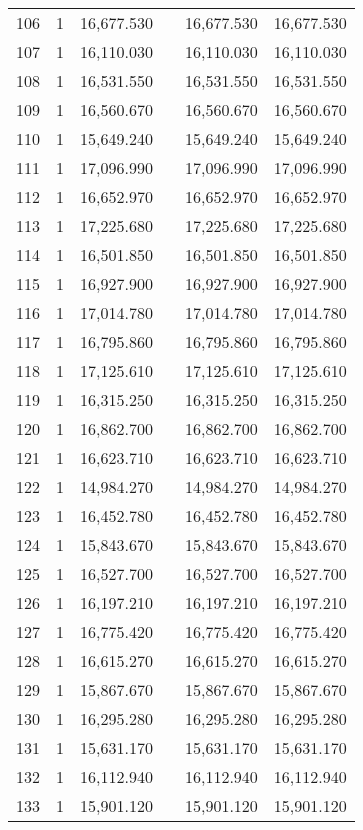 \begin{table}[!htbp]
\begin{tabular}{@{\extracolsep{5pt}}lccccc}
106 & 1 & 16,677.530 &  & 16,677.530 & 16,677.530 \\ 
107 & 1 & 16,110.030 &  & 16,110.030 & 16,110.030 \\ 
108 & 1 & 16,531.550 &  & 16,531.550 & 16,531.550 \\ 
109 & 1 & 16,560.670 &  & 16,560.670 & 16,560.670 \\ 
110 & 1 & 15,649.240 &  & 15,649.240 & 15,649.240 \\ 
111 & 1 & 17,096.990 &  & 17,096.990 & 17,096.990 \\ 
112 & 1 & 16,652.970 &  & 16,652.970 & 16,652.970 \\ 
113 & 1 & 17,225.680 &  & 17,225.680 & 17,225.680 \\ 
114 & 1 & 16,501.850 &  & 16,501.850 & 16,501.850 \\ 
115 & 1 & 16,927.900 &  & 16,927.900 & 16,927.900 \\ 
116 & 1 & 17,014.780 &  & 17,014.780 & 17,014.780 \\ 
117 & 1 & 16,795.860 &  & 16,795.860 & 16,795.860 \\ 
118 & 1 & 17,125.610 &  & 17,125.610 & 17,125.610 \\ 
119 & 1 & 16,315.250 &  & 16,315.250 & 16,315.250 \\ 
120 & 1 & 16,862.700 &  & 16,862.700 & 16,862.700 \\ 
121 & 1 & 16,623.710 &  & 16,623.710 & 16,623.710 \\ 
122 & 1 & 14,984.270 &  & 14,984.270 & 14,984.270 \\ 
123 & 1 & 16,452.780 &  & 16,452.780 & 16,452.780 \\ 
124 & 1 & 15,843.670 &  & 15,843.670 & 15,843.670 \\ 
125 & 1 & 16,527.700 &  & 16,527.700 & 16,527.700 \\ 
126 & 1 & 16,197.210 &  & 16,197.210 & 16,197.210 \\ 
127 & 1 & 16,775.420 &  & 16,775.420 & 16,775.420 \\ 
128 & 1 & 16,615.270 &  & 16,615.270 & 16,615.270 \\ 
129 & 1 & 15,867.670 &  & 15,867.670 & 15,867.670 \\ 
130 & 1 & 16,295.280 &  & 16,295.280 & 16,295.280 \\ 
131 & 1 & 15,631.170 &  & 15,631.170 & 15,631.170 \\ 
132 & 1 & 16,112.940 &  & 16,112.940 & 16,112.940 \\ 
133 & 1 & 15,901.120 &  & 15,901.120 & 15,901.120 \\ 

\end{tabular}
\end{table}
